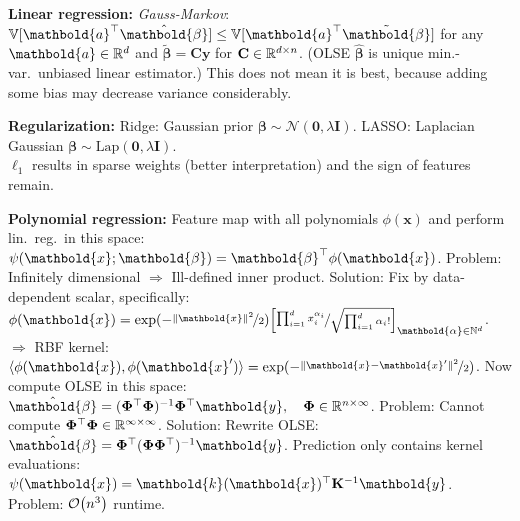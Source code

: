 \documentclass[9pt]{extarticle}
\newenvironment{topic}[1]
{\textbf{\sffamily \colorbox{black}{\rlap{\textbf{\textcolor{white}{#1}}}\hspace{\linewidth}\hspace{-2\fboxsep}}}}
{}
\newenvironment{subtopic}[1]
{\textbf{\sffamily #1:}}
{}
\renewcommand{\mat}[1]{\ensuremath{\mathbf{#1}}}
\renewcommand{\vec}[1]{\ensuremath{\mathbold{#1}}}
\renewcommand{\Var}{\mathbb{V}}
\begin{document}
\begin{multicols*}{3}
\begin{topic}{Regression}
\begin{subtopic}{Linear regression}
            \textit{Gauss-Markov}: $\Var[\transpose{\vec{a}} \hat{\vec{\beta}}] \leq
                \Var[\transpose{\vec{a}} \tilde{\vec{\beta}}]$ for any $\vec{a} \in \R^d$ and
            $\tilde{\vec{\beta}} = \mat{C}\vec{y}$ for $\mat{C} \in \R^{d \times n}$. (OLSE $\hat{\vec{\beta}}$ is unique min.-var.\
            unbiased linear estimator.) This does not mean it is best, because
            adding some bias may decrease variance considerably.
        \end{subtopic}

        \begin{subtopic}{Regularization}
            Ridge: Gaussian prior $\vec{\beta} \sim \mathcal{N}(\vec{0}, \lambda \mat{I})$. LASSO:
            Laplacian Gaussian $\vec{\beta} \sim \mathrm{Lap}(\vec{0}, \lambda \mat{I})$. \\ $\ell_1$
            results in sparse weights (better interpretation) and the sign of features remain.
        \end{subtopic}

        \begin{subtopic}{Polynomial regression}
            Feature map with all polynomials $\phi(\vec{x})$ and perform lin.\ reg.\ in this space: $\psi(\vec{x}; \vec{\beta}) = \transpose{\vec{\beta}} \phi(\vec{x})$.
            Problem: Infinitely dimensional $\Rightarrow$ Ill-defined inner product. Solution: Fix by
            data-dependent scalar, specifically: $\phi(\vec{x}) = \exp(-\nicefrac{\| \vec{x} \|^2}{2}) \lft[ \nicefrac{\prod_{i=1}^d x_i^{\alpha_i}}{\sqrt{\prod_{i=1}^d \alpha_i!}} \rgt]_{\vec{\alpha} \in \mathbb{N}^d}$. \\
            $\Rightarrow$ RBF kernel: $\langle \phi(\vec{x}), \phi(\vec{x}') \rangle = \exp (
                -\nicefrac{\| \vec{x} - \vec{x}' \|^2}{2} )$. Now compute OLSE in this space: $\hat{\vec{\beta}} =
                \inv{(\transpose{\mat{\Phi}} \mat{\Phi})} \transpose{\mat{\Phi}} \vec{y}, \quad \mat{\Phi} \in
                \R^{n \times \infty}$. Problem: Cannot compute $\transpose{\mat{\Phi}} \mat{\Phi} \in \R^{\infty
                    \times \infty}$. Solution: Rewrite OLSE: $\hat{\vec{\beta}} = \transpose{\mat{\Phi}}
                \inv{(\mat{\Phi} \transpose{\mat{\Phi}})} \vec{y}$. Prediction only contains kernel evaluations:
            $\psi(\vec{x}) = \transpose{\vec{k}(\vec{x})} \inv{\mat{K}} \vec{y}$. Problem: $\bigo{n^3}$
            runtime.

        \end{subtopic}


\end{topic}
\end{multicols*}
\end{document}
